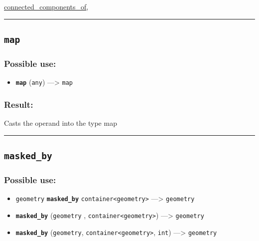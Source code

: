 \documentclass[]{book}
\providecommand{\tightlist}{%
  \setlength{\itemsep}{0pt}\setlength{\parskip}{0pt}}
\theoremstyle{definition}
\theoremstyle{definition}
\theoremstyle{definition}
\theoremstyle{remark}
\begin{document}
\href{OperatorsBC\#connected_components_of}{connected\_components\_of},

\begin{center}\rule{0.5\linewidth}{\linethickness}\end{center}

\subsection{\texorpdfstring{\texttt{map}}{map}}\label{map}

\subsubsection{Possible use:}\label{possible-use-333}

\begin{itemize}
\tightlist
\item
  \textbf{\texttt{map}} (\texttt{any}) ---\textgreater{} \texttt{map}
\end{itemize}

\subsubsection{Result:}\label{result-323}

Casts the operand into the type map

\begin{center}\rule{0.5\linewidth}{\linethickness}\end{center}

\subsection{\texorpdfstring{\texttt{masked\_by}}{masked\_by}}\label{masked_by}

\subsubsection{Possible use:}\label{possible-use-334}

\begin{itemize}
\tightlist
\item
  \texttt{geometry} \textbf{\texttt{masked\_by}}
  \texttt{container\textless{}geometry\textgreater{}} ---\textgreater{}
  \texttt{geometry}
\item
  \textbf{\texttt{masked\_by}} (\texttt{geometry} ,
  \texttt{container\textless{}geometry\textgreater{}}) ---\textgreater{}
  \texttt{geometry}
\item
  \textbf{\texttt{masked\_by}} (\texttt{geometry},
  \texttt{container\textless{}geometry\textgreater{}}, \texttt{int})
  ---\textgreater{} \texttt{geometry}
\end{itemize}
\end{document}
